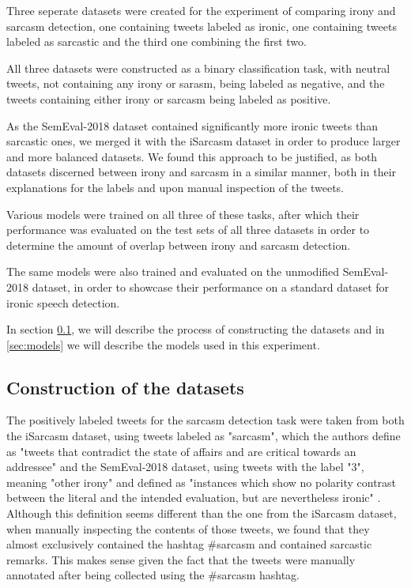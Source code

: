 \documentclass[10pt, a4paper]{article}
\begin{document}
Three seperate datasets were created for the experiment of comparing irony and sarcasm detection, one containing tweets labeled
as ironic, one containing tweets labeled as sarcastic and the third one combining the first two.

All three datasets were constructed as a binary classification task, with neutral tweets, not containing any irony or sarasm,
being labeled as negative, and the tweets containing either irony or sarcasm being labeled as positive.

As the SemEval-2018 dataset contained significantly more
ironic tweets than sarcastic ones, we merged it with the iSarcasm dataset in order to produce larger and more balanced datasets.
We found this approach to be justified, as both datasets discerned between irony and sarcasm in a similar manner, both in
their explanations for the labels and upon manual inspection of the tweets. 

Various models were trained on all three of these tasks, after which their performance was evaluated on the test sets of all
three datasets in order to determine the amount of overlap between irony and sarcasm detection.

The same models were also trained and evaluated on the unmodified SemEval-2018 dataset, in order to showcase their performance
on a standard dataset for ironic speech detection.

In section \ref{sec:dataset_construction}, we will describe the process of constructing the datasets and in \ref{sec:models}
we will describe the models used in this experiment.

\subsection{Construction of the datasets}\label{sec:dataset_construction}

The positively labeled tweets for the sarcasm detection task were taken from both the iSarcasm dataset, using tweets labeled
as "sarcasm", which the authors define as "tweets that contradict the state of affairs and are critical towards an addressee"
\citep{iSarcasm} and the SemEval-2018 dataset, using tweets with the label "3", meaning "other irony" and defined as "instances
which show no polarity contrast between the literal and the intended evaluation, but are nevertheless ironic" 
\citep{semeval-2018}. Although this definition seems different than the one from the iSarcasm dataset, when manually
inspecting the contents of those tweets, we found that they almost exclusively contained the hashtag \#sarcasm and contained
sarcastic remarks. This makes sense given the fact that the tweets were manually annotated after being collected using the
\#sarcasm hashtag.
\end{document}
